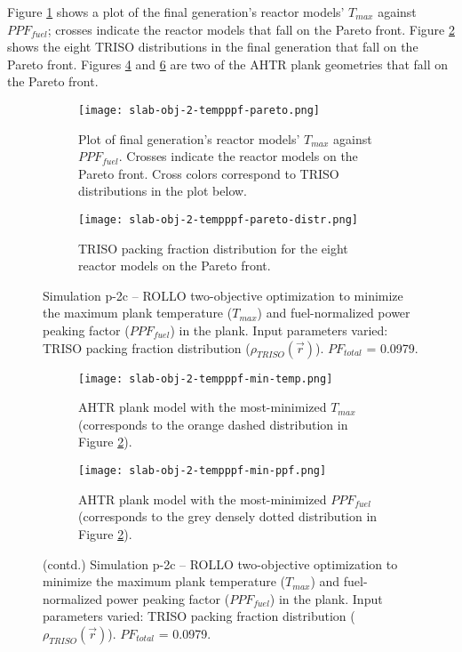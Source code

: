 Figure \ref{fig:slab-obj-2-tempppf-pareto} shows a plot of the final generation's 
reactor models' $T_{max}$ against $PPF_{fuel}$; crosses indicate the reactor models that 
fall on the Pareto front.
Figure \ref{fig:slab-obj-2-tempppf-pareto-distr} shows the eight TRISO distributions in 
the final generation that fall on the Pareto front. 
Figures \ref{fig:slab-obj-2-tempppf-min-temp} and \ref{fig:slab-obj-2-tempppf-min-ppf} 
are two of the \gls{AHTR} plank geometries that fall on the Pareto front. 
\begin{figure}[htbp!]
    \centering
    \begin{subfigure}{\textwidth}
        \texttt{[image: slab-obj-2-tempppf-pareto.png]}
        \caption{Plot of final generation's reactor models' $T_{max}$ against 
        $PPF_{fuel}$. Crosses indicate the reactor models on the Pareto front.
        Cross colors correspond to TRISO distributions in the plot below.}
        \label{fig:slab-obj-2-tempppf-pareto} 
    \end{subfigure}
    \begin{subfigure}{\textwidth}
        \texttt{[image: slab-obj-2-tempppf-pareto-distr.png]}
        \caption{TRISO packing fraction distribution for the eight reactor models on the 
        Pareto front.}
        \label{fig:slab-obj-2-tempppf-pareto-distr} 
    \end{subfigure}
    \caption{Simulation p-2c -- ROLLO two-objective optimization to minimize the 
    maximum plank temperature ($T_{max}$) and fuel-normalized power peaking factor 
    ($PPF_{fuel}$) in the plank. 
    Input parameters varied: TRISO packing fraction distribution 
    ($\rho_{TRISO}(\vec{r})$). $PF_{total}$ = 0.0979.}
    \label{fig:slab-obj-2-tempppf}
\end{figure}
\begin{figure}[htbp!]
    \ContinuedFloat
    \begin{subfigure}{\textwidth}
        \texttt{[image: slab-obj-2-tempppf-min-temp.png]}
        \caption{\gls{AHTR} plank model with the most-minimized $T_{max}$
        (corresponds to the orange dashed distribution in Figure 
        \ref{fig:slab-obj-2-tempppf-pareto-distr}).}
        \label{fig:slab-obj-2-tempppf-min-temp} 
    \end{subfigure}
    \begin{subfigure}{\textwidth}
        \texttt{[image: slab-obj-2-tempppf-min-ppf.png]}
        \caption{\gls{AHTR} plank model with the most-minimized $PPF_{fuel}$
        (corresponds to the grey densely dotted distribution in Figure 
        \ref{fig:slab-obj-2-tempppf-pareto-distr}).}
        \label{fig:slab-obj-2-tempppf-min-ppf} 
    \end{subfigure}
    \caption{(contd.) Simulation p-2c -- ROLLO two-objective optimization to minimize 
    the maximum plank temperature ($T_{max}$) and fuel-normalized power peaking factor 
    ($PPF_{fuel}$) in the plank. 
    Input parameters varied: TRISO packing fraction distribution 
    ($\rho_{TRISO}(\vec{r})$). $PF_{total}$ = 0.0979.}
\end{figure}

